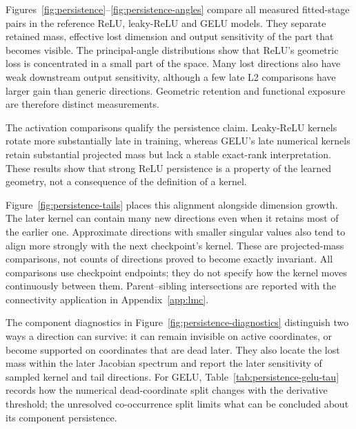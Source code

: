 Figures~\ref{fig:persistence}--\ref{fig:persistence-angles} compare all measured fitted-stage pairs in the reference ReLU, leaky-ReLU and GELU models. They separate retained mass, effective lost dimension and output sensitivity of the part that becomes visible. The principal-angle distributions show that ReLU's geometric loss is concentrated in a small part of the space. Many lost directions also have weak downstream output sensitivity, although a few late L2 comparisons have larger gain than generic directions. Geometric retention and functional exposure are therefore distinct measurements.

The activation comparisons qualify the persistence claim. Leaky-ReLU kernels rotate more substantially late in training, whereas GELU's late numerical kernels retain substantial projected mass but lack a stable exact-rank interpretation. These results show that strong ReLU persistence is a property of the learned geometry, not a consequence of the definition of a kernel.



Figure~\ref{fig:persistence-tails} places this alignment alongside dimension growth. The later kernel can contain many new directions even when it retains most of the earlier one. Approximate directions with smaller singular values also tend to align more strongly with the next checkpoint's kernel. These are projected-mass comparisons, not counts of directions proved to become exactly invariant. All comparisons use checkpoint endpoints; they do not specify how the kernel moves continuously between them. Parent--sibling intersections are reported with the connectivity application in Appendix~\ref{app:lmc}.



The component diagnostics in Figure~\ref{fig:persistence-diagnostics} distinguish two ways a direction can survive: it can remain invisible on active coordinates, or become supported on coordinates that are dead later. They also locate the lost mass within the later Jacobian spectrum and report the later sensitivity of sampled kernel and tail directions. For GELU, Table~\ref{tab:persistence-gelu-tau} records how the numerical dead-coordinate split changes with the derivative threshold; the unresolved co-occurrence split limits what can be concluded about its component persistence.



\FloatBarrier
